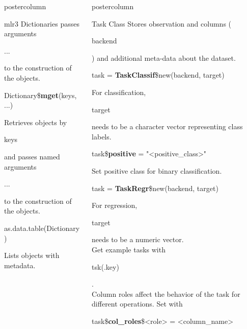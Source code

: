 \documentclass{beamer}
\newlength{\columnheight} %
\newcommand{\codeinline}[1]{\begin{codeboxinline}#1\end{codeboxinline}}
\begin{document}
\begin{frame}[fragile]{}
\begin{columns}
\begin{column}{.245\textwidth}
\begin{beamercolorbox}[center]{postercolumn}
\begin{minipage}{.98\textwidth}
{\begin{myblock}{mlr3 Dictionaries}
							passes arguments \codeinline{...} to the construction of the objects.
							\\
							\begin{codebox}
								Dictionary\$\textbf{mget}(keys, ...)
							\end{codebox}
							Retrieves objects by \codeinline{keys} and 
							passes named arguments \codeinline{...} to the construction of the objects. 
							\\
							\begin{codebox}
								as.data.table(Dictionary)
							\end{codebox}
							Lists objects with metadata.
						\end{myblock}
					}
				\end{minipage}
			\end{beamercolorbox}
		\end{column}
		\begin{column}{.245\textwidth}
			\begin{beamercolorbox}[center]{postercolumn}
				\begin{minipage}{.98\textwidth}
					\parbox[t][\columnheight]{\textwidth}{
					\begin{myblock}{Task Class}
						Stores observation and columns (\codeinline{backend}) and additional
						meta-data about the dataset.
						\\
						\begin{codebox}
							task = \textbf{TaskClassif}\$new(backend, target)
						\end{codebox}
						For classification, \codeinline{target} needs to be a character vector representing class labels.
						\\
						\begin{codebox}
							task\$\textbf{positive} = "<positive\_class>"
						\end{codebox}
						Set positive class for binary classification.
						\\
						\begin{codebox}
							task = \textbf{TaskRegr}\$new(backend, target)
						\end{codebox}
						For regression, \codeinline{target} needs to be a numeric vector.
						\\
                        Get example tasks with \codeinline{tsk(.key)}.
						\vspace{1em}
						\\
						Column roles affect the behavior of the task for different operations. Set with \codeinline{task\$\textbf{col\_roles}\$<role> = <column\_name>}

\end{myblock}}
\end{minipage}
\end{beamercolorbox}
\end{column}
\end{columns}
\end{frame}
\end{document}
